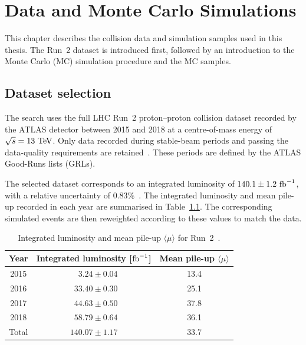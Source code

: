 \chapter{Data and Monte Carlo Simulations}
\label{chapter:MC_simulation}

This chapter describes the collision data and simulation samples used in this thesis.
The Run~2 dataset is introduced first, followed by an introduction to the Monte Carlo (MC) simulation procedure and the MC samples.


\section{Dataset selection}
\label{sec:dataset_selection}

The search uses the full LHC Run~2 proton--proton collision dataset recorded by the ATLAS detector between 2015 and 2018 at a centre-of-mass energy of $\sqrt{s}=13~\mathrm{TeV}$.
Only data recorded during stable-beam periods and passing the data-quality requirements are retained~\cite{ATLASDataQualityRun2}.
These periods are defined by the ATLAS Good-Runs lists (GRLs).

The selected dataset corresponds to an integrated luminosity of $140.1\pm1.2~\mathrm{fb}^{-1}$, with a relative uncertainty of $0.83\%$~\cite{ATLASLumiRun2}.
The integrated luminosity and mean pile-up recorded in each year are summarised in Table~\ref{tab:run2_luminosity_pileup}.
The corresponding simulated events are then reweighted according to these values to match the data.

\begin{table}[htbp]
    \centering
    \caption[Run~2 integrated luminosity and mean pile-up]{Integrated luminosity and mean pile-up $\langle\mu\rangle$ for Run~2~\cite{ATLASLumiRun2}.}
    \label{tab:run2_luminosity_pileup}
    \begin{tabular}{ccc}
        \hline
        Year & Integrated luminosity [$\mathrm{fb}^{-1}$] & Mean pile-up $\langle\mu\rangle$ \\
        \hline
        2015 & $\phantom{00}3.24 \pm 0.04$ & 13.4 \\
        2016 & $\phantom{0}33.40 \pm 0.30$ & 25.1 \\
        2017 & $\phantom{0}44.63 \pm 0.50$ & 37.8 \\
        2018 & $\phantom{0}58.79 \pm 0.64$ & 36.1 \\
        \hline
        Total & $140.07 \pm 1.17$ & 33.7 \\
        \hline
    \end{tabular}
\end{table}


